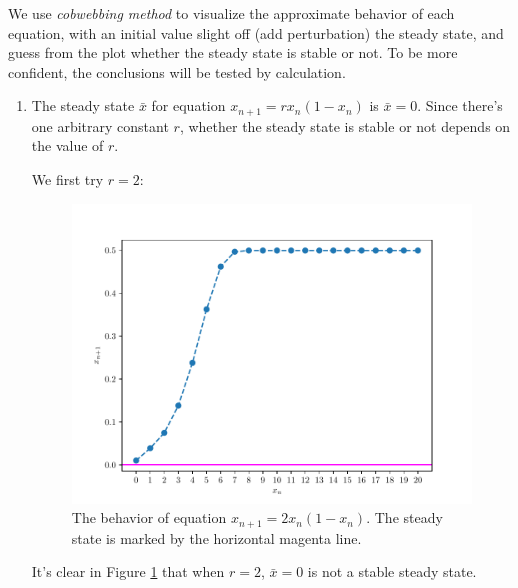 \begin{homeworkProblem}[2]
We use \textit{cobwebbing method} to visualize the approximate behavior of each
equation, with an initial value slight off (add perturbation) the steady state,
and guess from the plot whether the steady state is stable or not. To be more
confident, the conclusions will be tested by calculation.

\begin{enumerate}
\item The steady state $\bar x$ for equation $x_{n+1} = rx_n(1-x_n)$ is
$\bar x = 0$. Since there's one arbitrary constant $r$, whether the steady
state is stable or not depends on the value of $r$.

We first try $r=2$:
\begin{figure}
    \centering
    \caption[The behavior of equation $x_{n+1} = 2x_n(1-x_n)$]
    {The behavior of equation $x_{n+1} = 2x_n(1-x_n)$. The
    steady state is marked by the horizontal magenta line.}
    \label{fig:fig2a1}
    \includegraphics[scale=0.6]{../fig/fig2(a)(1).pdf}
\end{figure}
It's clear in Figure \ref{fig:fig2a1} that when $r=2$, $\bar x = 0$ is not a
stable steady state.


\end{enumerate}
\end{homeworkProblem}
